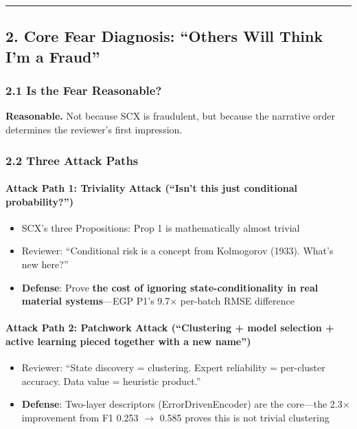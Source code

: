 \documentclass[
  12pt,
]{article}
\providecommand{\tightlist}{%
  \setlength{\itemsep}{0pt}\setlength{\parskip}{0pt}}
\begin{document}
\begin{center}\rule{0.5\linewidth}{0.5pt}\end{center}

\subsection{2. Core Fear Diagnosis: ``Others Will Think I'm a Fraud''}\label{core-fear-diagnosis-others-will-think-im-a-fraud}

\subsubsection{2.1 Is the Fear Reasonable?}\label{is-the-fear-reasonable}

\textbf{Reasonable.} Not because SCX is fraudulent, but because the narrative order determines the reviewer's first impression.

\subsubsection{2.2 Three Attack Paths}\label{three-attack-paths}

\paragraph{Attack Path 1: Triviality Attack (``Isn't this just conditional probability?'')}\label{attack-path-1-triviality-attack}

\begin{itemize}
\tightlist
\item
  SCX's three Propositions: Prop 1 is mathematically almost trivial
\item
  Reviewer: ``Conditional risk is a concept from Kolmogorov (1933). What's new here?''
\item
  \textbf{Defense}: Prove \textbf{the cost of ignoring state-conditionality in real material systems}---EGP P1's 9.7$\times$ per-batch RMSE difference
\end{itemize}

\paragraph{Attack Path 2: Patchwork Attack (``Clustering + model selection + active learning pieced together with a new name'')}\label{attack-path-2-patchwork-attack}

\begin{itemize}
\tightlist
\item
  Reviewer: ``State discovery = clustering. Expert reliability = per-cluster accuracy. Data value = heuristic product.''
\item
  \textbf{Defense}: Two-layer descriptors (ErrorDrivenEncoder) are the core---the 2.3$\times$ improvement from F1 0.253 $\rightarrow$ 0.585 proves this is not trivial clustering
\end{itemize}
\end{document}
